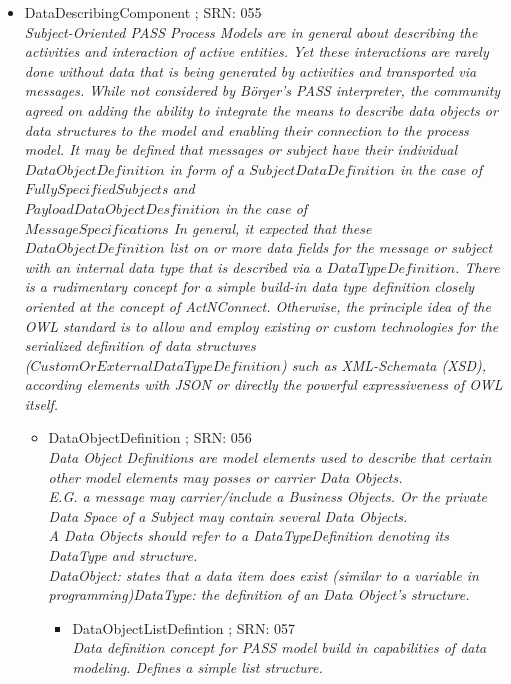 \begin{itemize}
\begin{itemize}
	\item DataDescribingComponent ; SRN: 055 \\ \textit{Subject-Oriented PASS Process Models are in general about describing the activities and interaction of active entities. Yet these interactions are rarely done without data that is being generated by activities and transported via messages. While not considered by Börger's PASS interpreter, the community agreed on adding the ability to integrate the means to describe data objects or data structures to the model and enabling their connection to the process model. It may be defined that messages or subject have their individual $DataObjectDefinition$ in form of a $SubjectDataDefinition$ in the case of $FullySpecifiedSubject$s and \\ $PayloadDataObjectDesfinition$ in the case of \\ $MessageSpecifications$ In general, it expected that these \\ $DataObjectDefinition$ list on or more data fields for the message or subject with an internal data type that is described via a $DataTypeDefinition$. There is a rudimentary concept for a simple build-in data type definition closely oriented at the concept of ActNConnect. Otherwise, the principle idea of the OWL standard is to allow and employ existing or custom technologies for the serialized definition of data structures \\ ($CustomOrExternalDataTypeDefinition$) such as XML-Schemata (XSD), according elements with JSON or directly the powerful expressiveness of OWL itself.}
	\begin{itemize}
		\item DataObjectDefinition ; SRN: 056 \\ \textit{Data Object Definitions are model elements used to describe that certain other model elements may posses or carrier Data Objects.\\ E.G. a message may carrier/include a Business Objects. Or the private Data Space of a Subject may contain several Data Objects. \\A Data Objects should refer to a DataTypeDefinition denoting its DataType and structure.\\ DataObject: states that a data item does exist (similar to a variable in programming)DataType: the definition of an Data Object's structure.}
		\begin{itemize}
			\item DataObjectListDefintion ; SRN: 057 \\ \textit{Data definition concept for PASS model build in capabilities of data modeling. Defines a simple list structure.}

\end{itemize}
\end{itemize}
\end{itemize}
\end{itemize}
